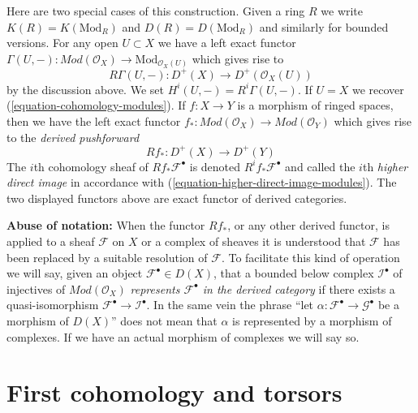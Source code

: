 \medskip\noindent
Here are two special cases of this construction.
Given a ring $R$ we write $K(R) = K(\text{Mod}_R)$ and
$D(R) = D(\text{Mod}_R)$ and similarly for bounded versions.
For any open $U \subset X$ we have a left exact functor
$
\Gamma(U, -) :
\textit{Mod}(\mathcal{O}_X)
\longrightarrow
\text{Mod}_{\mathcal{O}_X(U)}
$
which gives rise to
\begin{equation}
\label{equation-total-derived-cohomology}
R\Gamma(U, -) :
D^{+}(X)
\longrightarrow
D^{+}(\mathcal{O}_X(U))
\end{equation}
by the discussion above. We set $H^i(U, -) = R^i\Gamma(U, -)$.
If $U = X$ we recover (\ref{equation-cohomology-modules}).
If $f : X \to Y$ is a morphism of ringed spaces, then we have
the left exact functor
$
f_* :
\textit{Mod}(\mathcal{O}_X)
\longrightarrow
\textit{Mod}(\mathcal{O}_Y)
$
which gives rise to the {\it derived pushforward}
\begin{equation}
\label{equation-total-derived-direct-image}
Rf_* :
D^{+}(X)
\longrightarrow
D^{+}(Y)
\end{equation}
The $i$th cohomology sheaf of $Rf_*\mathcal{F}^\bullet$ is denoted
$R^if_*\mathcal{F}^\bullet$ and called the $i$th {\it higher direct image}
in accordance with (\ref{equation-higher-direct-image-modules}).
The two displayed functors above are exact functor
of derived categories.

\medskip\noindent
{\bf Abuse of notation:} When the functor $Rf_*$, or any other
derived functor, is applied to a sheaf $\mathcal{F}$ on $X$ or a complex
of sheaves it is understood that $\mathcal{F}$ has been replaced by a
suitable resolution of $\mathcal{F}$. To facilitate this kind of
operation we will say, given an object $\mathcal{F}^\bullet \in D(X)$,
that a bounded below complex $\mathcal{I}^\bullet$ of injectives of
$\textit{Mod}(\mathcal{O}_X)$
{\it represents $\mathcal{F}^\bullet$ in the derived category}
if there exists a quasi-isomorphism
$\mathcal{F}^\bullet \to \mathcal{I}^\bullet$. In the same vein the phrase
``let $\alpha : \mathcal{F}^\bullet \to \mathcal{G}^\bullet$ be
a morphism of $D(X)$'' does not mean that $\alpha$ is represented by a
morphism of complexes. If we have an actual morphism of complexes we will
say so.









\section{First cohomology and torsors}
\label{section-h1-torsors}

